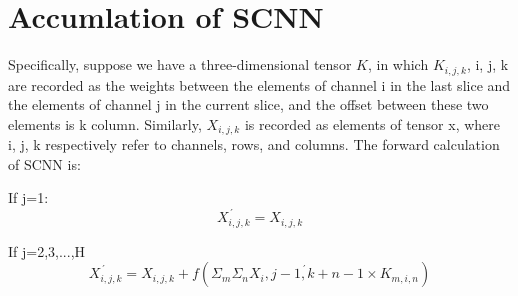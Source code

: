 \documentclass[10pt,twocolumn,letterpaper]{article}
\begin{document}
\section{Accumlation of SCNN}
Specifically, suppose we have a three-dimensional tensor $K$, in which $K_{i,j,k}$, i, j, k are recorded as the weights between the elements of channel i in the last slice and the elements of channel j in the current slice, and the offset between these two elements is k column. Similarly, $X_{i, j, k}$ is recorded as elements of tensor x, where i, j, k respectively refer to channels, rows, and columns.
The forward calculation of SCNN is:
\par If j=1:
\begin{equation}
\acute{X_{i,j,k}}=X_{i,j,k}
\end{equation}
\par If j=2,3,...,H
\begin{equation}
\acute{X_{i,j,k}}=X_{i,j,k}+f(\Sigma_{m}\Sigma_{n}\acute{X_i,j-1,k+n-1}\times K_{m,i,n})       
\end{equation}


\end{document}
